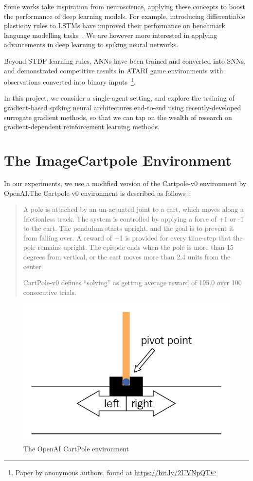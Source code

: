 \documentclass[fyp]{socreport}
\begin{document}
Some works take inspiration from neuroscience, applying these concepts to boost
the performance of deep learning models. For example, introducing differentiable
plasticity rules to LSTMs have improved their performance on benchmark language
modelling tasks~\cite{miconi2018backpropamine}. We are however more interested
in applying advancements in deep learning to spiking neural networks.

Beyond STDP learning rules, ANNs have been trained and converted into SNNs, and
demonstrated competitive results in ATARI game environments with observations
converted into binary inputs~\footnote{Paper by anonymous authors, found at
  \url{https://bit.ly/2UVNpQT}}.

In this project, we consider a single-agent setting, and explore the training of
gradient-based spiking neural architectures end-to-end using recently-developed
surrogate gradient methods, so that we can tap on the wealth of research on
gradient-dependent reinforcement learning methods.

\section{The ImageCartpole Environment}

In our experiments, we use a modified version of the Cartpole-v0 environment by
OpenAI.\@ The Cartpole-v0 environment is described as follows~\cite{openai_gym}:

\begin{quote} A pole is attached by an un-actuated joint to a cart, which moves
along a frictionless track. The system is controlled by applying a force of +1
or -1 to the cart. The pendulum starts upright, and the goal is to prevent it
from falling over. A reward of +1 is provided for every time-step that the pole
remains upright. The episode ends when the pole is more than 15 degrees from
vertical, or the cart moves more than 2.4 units from the center.

CartPole-v0 defines ``solving'' as getting average reward of 195.0 over 100
consecutive trials.

\end{quote}

\begin{figure}[htbp] \centering
  \includegraphics[width=.55\linewidth]{images/openai_gym.png}
  \caption{The OpenAI CartPole environment}
\end{figure}
\end{document}
